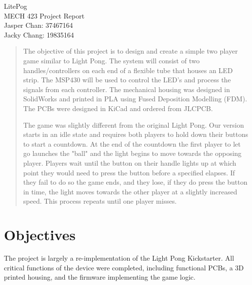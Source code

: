 \documentclass{notes}
\begin{document}
\vspace*{\fill}
\begin{center}
    {\centering\huge{LitePog}}\\
    \vspace*{2em}
    {\centering\huge{MECH 423 Project Report}}\\
    \vspace*{2em}
    {\large Jasper Chan: 37467164 }\\
    {\large Jacky Chang: 19835164 }
\end{center}
\vspace*{\fill}
\newpage

\begin{abstract}
    The objective of this project is to design and create a simple two player game similar to Light Pong\footnotemark.
    The system will consist of two handles/controllers on each end of a flexible tube that houses an LED strip.
    The MSP430 will be used to control the LED's and process the signals from each controller.
    The mechanical housing was designed in SolidWorks and printed in PLA using Fused Deposition Modelling (FDM).
    The PCBs were designed in KiCad and ordered from JLCPCB.

    The game was slightly different from the original Light Pong.
    Our version starts in an idle state and requires both players to hold down their buttons to start a countdown.
    At the end of the countdown the first player to let go launches the "ball" and the light begins to move towards the opposing player.
    Players wait until the button on their handle lights up at which point they would need to press the button before a specified elapses.
    If they fail to do so the game ends, and they lose, if they do press the button in time, the light moves towards the other player at a slightly increased speed.
    This process repeats until one player misses.
\end{abstract}

\section{Objectives}

The project is largely a re-implementation of the Light Pong Kickstarter.
All critical functions of the device were completed, including functional PCBs, a 3D printed housing, and the firmware implementing the game logic.
\end{document}
